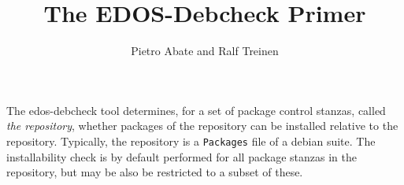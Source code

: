 \documentclass{article}
\title{The EDOS-Debcheck Primer}
\author{Pietro Abate and Ralf Treinen}
\newcommand{\debcheck}{edos-debcheck}
\begin{document}
\maketitle

The \debcheck{} tool determines, for a set of package control stanzas,
called \emph{the repository}, whether packages of the repository can
be installed relative to the repository. Typically, the repository is
a \texttt{Packages} file of a debian suite. The installability check
is by default performed for all package stanzas in the repository, but
may be also be restricted to a subset of these.

\tableofcontents








% 



\end{document}
